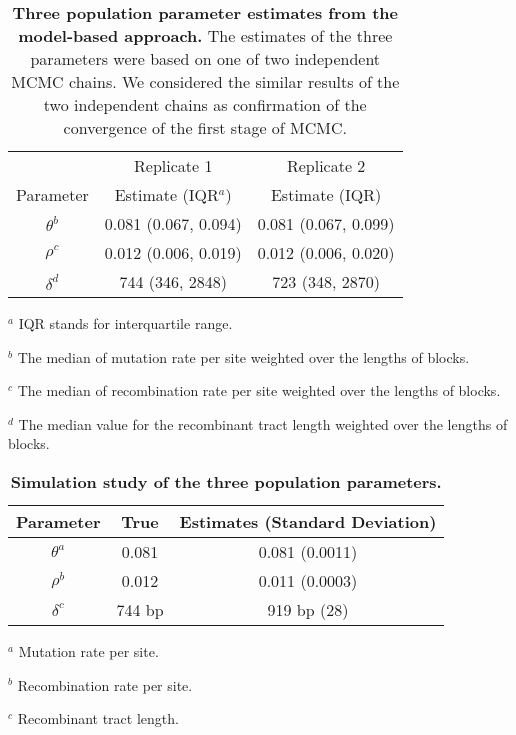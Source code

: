 \documentclass[12pt]{article}
\providecommand{\tabularnewline}{\\}
\begin{document}
\begin{table}[!ht]
\caption{
{\bf Three population parameter estimates from the model-based approach.}
The estimates of the three parameters were based on one of two independent
MCMC chains.  We considered the similar 
results of the two independent chains as confirmation of 
the convergence of the first stage of MCMC.}
\noindent \begin{centering}
\begin{tabular}{ccc}
\hline
& Replicate 1 & Replicate 2\tabularnewline
Parameter & Estimate (IQR$^a$) & Estimate (IQR)\tabularnewline
\hline
$\theta^b$ & 0.081 (0.067, 0.094) & 0.081 (0.067, 0.099)\tabularnewline
$\rho^c$ & 0.012 (0.006, 0.019) & 0.012 (0.006, 0.020)\tabularnewline
$\delta^d$ & 744 (346, 2848) & 723 (348, 2870)\tabularnewline
\hline
\end{tabular}
\par\end{centering}
\begin{flushleft}
$^a$ IQR stands for interquartile range.

$^b$ The median of mutation rate per site weighted over the lengths of blocks. 

$^c$ The median of recombination rate per site weighted over the lengths of blocks.

$^d$ The median value for the recombinant tract length weighted over the lengths of blocks.
\end{flushleft}
\label{tab:three}
\end{table}

\begin{table}[!ht]
\caption{
{\bf Simulation study of the three population parameters.}}
\noindent \begin{centering}
\begin{tabular}{ccc}
\hline
Parameter & True & Estimates (Standard Deviation)\tabularnewline
\hline
$\theta^a$ & 0.081 & 0.081 (0.0011)\tabularnewline
$\rho^b$   & 0.012 & 0.011 (0.0003)\tabularnewline
$\delta^c$ & 744 bp & 919 bp (28)\tabularnewline
\hline
\end{tabular}
\par\end{centering}
\begin{flushleft}
$^a$ Mutation rate per site.

$^b$ Recombination rate per site.

$^c$ Recombinant tract length.
\end{flushleft}
\label{tab:sim-three}
\end{table}
\end{document}
